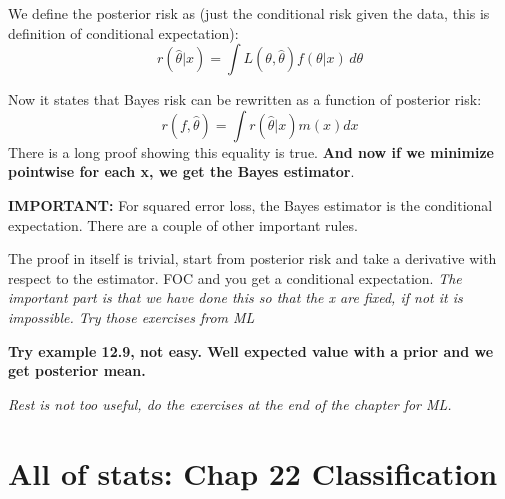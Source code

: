 \documentclass{article}
\begin{document}
We define the posterior risk as (just the conditional risk given the data, this is definition of conditional expectation): $$ r(\hat{\theta}| x) = \int L(\theta,\hat{\theta})f(\theta|x)\,d\theta $$

Now it states that Bayes risk can be rewritten as a function of posterior risk: $$r(f,\hat{\theta}) = \int r(\hat{\theta}|x) m(x) dx$$
There is a long proof showing this equality is true.
\textbf{And now if we minimize pointwise for each x, we get the Bayes estimator}.

\textbf{IMPORTANT:} For squared error loss, the Bayes estimator is the conditional expectation.
There are a couple of other important rules.

The proof in itself is trivial, start from posterior risk and take a derivative with respect to the estimator.
FOC and you get a conditional expectation. \textit{The important part is that we have done this so that the x are fixed, if not it is impossible. Try those exercises from ML}

\textbf{Try example 12.9, not easy. Well expected value with a prior and we get posterior mean.}

\textit{Rest is not too useful, do the exercises at the end of the chapter for ML.}

\section{All of stats: Chap 22 Classification}
\end{document}
